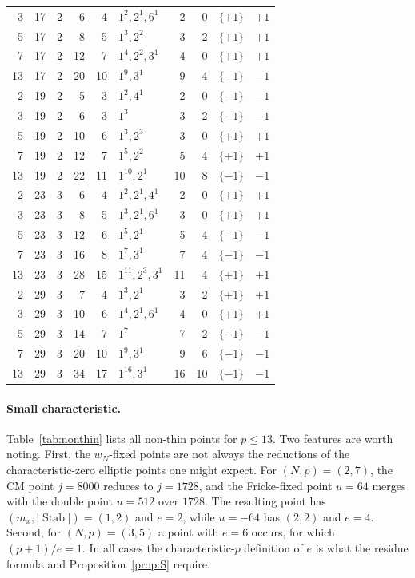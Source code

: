 \documentclass[11pt,a4paper]{article}
\numberwithin{equation}{section}
\theoremstyle{definition}
\theoremstyle{remark}
\newcommand{\Stab}{\operatorname{Stab}}
\begin{document}
{\begin{longtable}{rrrrrlrrcc}
3 & 17 & 2 & 6 & 4 & $1^{2}, 2^{1}, 6^{1}$ & 2 & 0 & $\{+1\}$ & $+1$\\
5 & 17 & 2 & 8 & 5 & $1^{3}, 2^{2}$ & 3 & 2 & $\{+1\}$ & $+1$\\
7 & 17 & 2 & 12 & 7 & $1^{4}, 2^{2}, 3^{1}$ & 4 & 0 & $\{+1\}$ & $+1$\\
13 & 17 & 2 & 20 & 10 & $1^{9}, 3^{1}$ & 9 & 4 & $\{-1\}$ & $-1$\\
2 & 19 & 2 & 5 & 3 & $1^{2}, 4^{1}$ & 2 & 0 & $\{-1\}$ & $-1$\\
3 & 19 & 2 & 6 & 3 & $1^{3}$ & 3 & 2 & $\{-1\}$ & $-1$\\
5 & 19 & 2 & 10 & 6 & $1^{3}, 2^{3}$ & 3 & 0 & $\{+1\}$ & $+1$\\
7 & 19 & 2 & 12 & 7 & $1^{5}, 2^{2}$ & 5 & 4 & $\{+1\}$ & $+1$\\
13 & 19 & 2 & 22 & 11 & $1^{10}, 2^{1}$ & 10 & 8 & $\{-1\}$ & $-1$\\
2 & 23 & 3 & 6 & 4 & $1^{2}, 2^{1}, 4^{1}$ & 2 & 0 & $\{+1\}$ & $+1$\\
3 & 23 & 3 & 8 & 5 & $1^{3}, 2^{1}, 6^{1}$ & 3 & 0 & $\{+1\}$ & $+1$\\
5 & 23 & 3 & 12 & 6 & $1^{5}, 2^{1}$ & 5 & 4 & $\{-1\}$ & $-1$\\
7 & 23 & 3 & 16 & 8 & $1^{7}, 3^{1}$ & 7 & 4 & $\{-1\}$ & $-1$\\
13 & 23 & 3 & 28 & 15 & $1^{11}, 2^{3}, 3^{1}$ & 11 & 4 & $\{+1\}$ & $+1$\\
2 & 29 & 3 & 7 & 4 & $1^{3}, 2^{1}$ & 3 & 2 & $\{+1\}$ & $+1$\\
3 & 29 & 3 & 10 & 6 & $1^{4}, 2^{1}, 6^{1}$ & 4 & 0 & $\{+1\}$ & $+1$\\
5 & 29 & 3 & 14 & 7 & $1^{7}$ & 7 & 2 & $\{-1\}$ & $-1$\\
7 & 29 & 3 & 20 & 10 & $1^{9}, 3^{1}$ & 9 & 6 & $\{-1\}$ & $-1$\\
13 & 29 & 3 & 34 & 17 & $1^{16}, 3^{1}$ & 16 & 10 & $\{-1\}$ & $-1$\\
\bottomrule
\end{longtable}
}


\paragraph{Small characteristic.} Table~\ref{tab:nonthin} lists all non-thin points for $p\le13$.
Two features are worth noting. First, the $w_N$-fixed points are not always the reductions of
the characteristic-zero elliptic points one might expect. For $(N,p)=(2,7)$, the CM point $j=8000$ reduces to $j=1728$, and the Fricke-fixed point $u=64$ merges with the double point $u=512$ over $1728$. The
resulting point has $(m_x,|\Stab|)=(1,2)$ and $e=2$, while $u=-64$ has $(2,2)$ and $e=4$.
Second, for $(N,p)=(3,5)$ a point with $e=6$ occurs, for which $(p+1)/e=1$. In all cases the
characteristic-$p$ definition of $e$ is what the residue formula and Proposition~\ref{prop:S} require.
\end{document}
